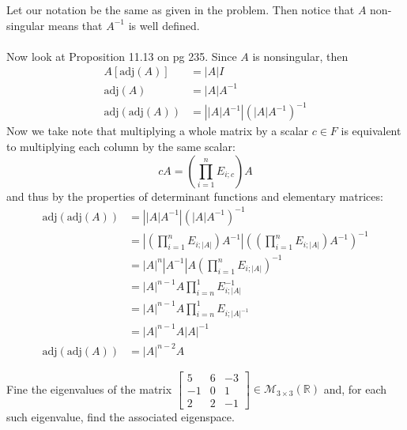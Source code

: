 \documentclass{article}
\begin{document}
\begin{solution}
Let our notation be the same as given in the problem. Then notice that $A$ non-singular means that $A^{-1}$ is well defined. 

\paragraph{}
Now look at Proposition 11.13 on pg 235. Since $A$ is nonsingular, then 
\begin{align*}
A[\text{adj}(A)] &= |A|I \\
\text{adj}(A) &= |A|A^{-1} \\
\text{adj}(\text{adj}(A)) &= \left| |A|A^{-1} \right| (|A|A^{-1})^{-1}
\end{align*}
Now we take note that multiplying a whole matrix by a scalar $c\in F$ is equivalent to multiplying each column by the same scalar:
\[
cA = \left( \prod_{i=1}^{n} E_{i;c} \right)A
\]
and thus by the properties of determinant functions and elementary matrices:
\begin{align*}
\text{adj}(\text{adj}(A)) &= \left| |A|A^{-1} \right| (|A|A^{-1})^{-1} \\
&= \left| \left( \prod_{i=1}^{n} E_{i;|A|} \right)A^{-1} \right| (\left( \prod_{i=1}^{n} E_{i;|A|} \right)A^{-1})^{-1} \\
&= |A|^{n}|A^{-1}| A \left(\prod_{i=1}^{n} E_{i;|A|}\right)^{-1} \\
&= |A|^{n-1} A \prod_{i=n}^{1} E_{i;|A|}^{-1} \\
&= |A|^{n-1} A \prod_{i=n}^{1} E_{i;|A|^{-1}} \\
&= |A|^{n-1} A |A|^{-1} \\
\text{adj}(\text{adj}(A)) &= |A|^{n-2} A
\end{align*}
\end{solution}

\setcounter{section}{12}
\setcounter{problem}{759}
\begin{problem}
Fine the eigenvalues of the matrix
$\begin{bmatrix}
5 & 6 & -3 \\
-1 & 0 & 1 \\
2 & 2 & -1
\end{bmatrix}
\in \mathcal{M}_{3\times 3}(\mathbb{R})$
and, for each such eigenvalue, find the associated eigenspace.
\end{problem}
\end{document}
